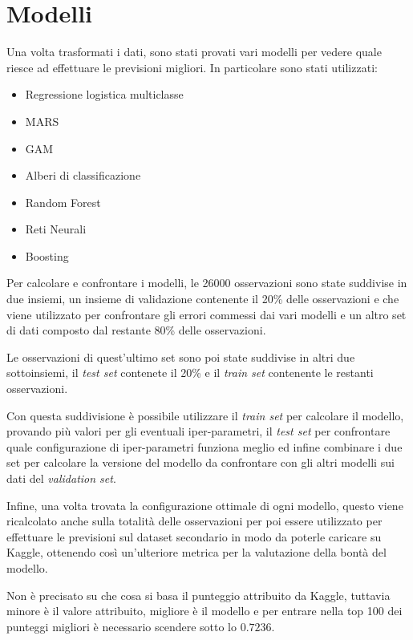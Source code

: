 
\section{Modelli}

Una volta trasformati i dati, sono stati provati vari modelli per vedere quale riesce ad effettuare le previsioni migliori.
In particolare sono stati utilizzati:

\begin{itemize}
	\item Regressione logistica multiclasse
	\item MARS
	\item GAM
	\item Alberi di classificazione
	\item Random Forest
	\item Reti Neurali
	\item Boosting
\end{itemize}

Per calcolare e confrontare i modelli, le 26000 osservazioni sono state suddivise in due insiemi, un insieme di validazione contenente il 20\% delle osservazioni e che viene utilizzato per confrontare gli errori commessi dai vari modelli e un altro set di dati composto dal restante 80\% delle osservazioni.

Le osservazioni di quest'ultimo set sono poi state suddivise in altri due sottoinsiemi, il \textit{test set} contenete il 20\% e il \textit{train set} contenente le restanti osservazioni. 

Con questa suddivisione è possibile utilizzare il \textit{train set} per calcolare il modello, provando più valori per gli eventuali iper-parametri, il \textit{test set} per confrontare quale configurazione di iper-parametri funziona meglio ed infine combinare i due set per calcolare la versione del modello da confrontare con gli altri modelli sui dati del \textit{validation set}.

Infine, una volta trovata la configurazione ottimale di ogni modello, questo viene ricalcolato anche sulla totalità delle osservazioni per poi essere utilizzato per effettuare le previsioni sul dataset secondario in modo da poterle caricare su Kaggle, ottenendo così un'ulteriore metrica per la valutazione della bontà del modello. 

Non è precisato su che cosa si basa il punteggio attribuito da Kaggle, tuttavia minore è il valore attribuito, migliore è il modello e per entrare nella top 100 dei punteggi migliori è necessario scendere sotto lo $0.7236$.

